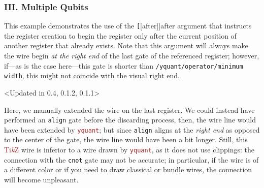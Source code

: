 \documentclass{scrartcl}
\makeatletter
\newenvironment{codeexample*}{%
   \VerbatimEnvironment%
   \let\FVB@VerbatimOut\minted@FVB@VerbatimOut
   \let\FVE@VerbatimOut\minted@FVE@VerbatimOut
   \minted@configlang{tex}%
   \minted@fvset
   \begin{VerbatimOut}[codes={\catcode`\^^I=12},firstline,lastline]{\minted@jobname.pyg}%
}{
   \end{VerbatimOut}%
   \minted@langlinenoson%
   \begin{adjustbox}{center}
       \minted@jobname.pyg %
   \end{adjustbox}\nopagebreak
   \expandafter\minted@pygmentize\expandafter{\minted@lang}%
   \minted@langlinenosoff%
   \par%
}
\def\TikZ{\textcolor{brown}{Ti\textit kZ}}
\def\pkg#1{\textcolor{brown}{\texttt{#1}}}
\def\ttlink{\link\texttt}
\def\Yquant{\pkg{yquant}}
\makeatother
\begin{document}
         \subsubsection{III. Multiple Qubits}
            \begin{example}
               \begin{codeexample*}
               \end{codeexample*}
               This example demonstrates the use of the \ttlink[{[after]}]{after} argument that instructs the register creation to begin the register only after the current position of another register that already exists.
               Note that this argument will always make the wire begin \emph{at the right end} of the last gate of the referenced register; however, if---as is the case here---this gate is shorter than \ttlink{/yquant/operator/minimum width}, this might not coincide with the visual right end.
            \end{example}

            \clearpage
            \begin{example}<Updated in 0.4, 0.1.2, 0.1.1>
               \begin{codeexample*}
               \end{codeexample*}
               Here, we manually extended the wire on the last register.
               We could instead have performed an \ttlink{align} gate before the discarding process, then, the wire line would have been extended by \Yquant{}; but since \ttlink{align} aligns at the \emph{right end} as opposed to the center of the gate, the wire line would have been a bit longer.
               Still, this \TikZ{} wire is inferior to a wire drawn by \Yquant, as it does not use clippings: the connection with the \ttlink{cnot} gate may not be accurate; in particular, if the wire is of a different color or if you need to draw classical or bundle wires, the connection will become unpleasant.
            \end{example}
\end{document}
